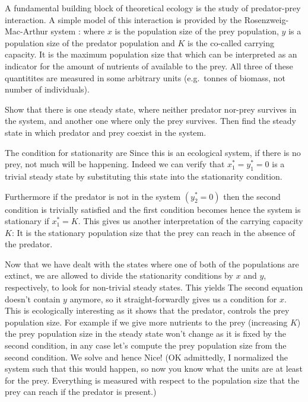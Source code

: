 
A fundamental building block of theoretical ecology is the study of predator-prey interaction. A simple model of this interaction is 
provided by the Rosenzweig-Mac-Arthur system \cite{Rosenzweig}:
where $x$ is the population size of the prey population, $y$ is a population size of the predator population and $K$ is the co-called 
carrying capacity. It is the maximum population size that which can be interpreted as an indicator for the amount of nutrients of available to the prey. All three of these quantitites are measured in some arbitrary units (e.g.~tonnes of biomass, not number of individuals).

\subquestion 
Show that there is one steady state, where neither predator nor-prey survives in the system, and another one where only the prey survives. Then find the steady state in which predator and prey coexist in the system.  

\solution 
The condition for stationarity are 
Since this is an ecological system, if there is no prey, not much will be happening. Indeed we can verify that $x_1^*=y_1^*=0$ is a trivial steady state by substituting this state into the stationarity condition.

Furthermore if the predator is not in the system $(y_2^*=0)$ then the second condition is trivially satisfied and the first condition becomes 
hence the system is stationary if $x_1^*=K$. This gives us another interpretation of the carrying capacity $K$: It is the stationary population size that the prey can reach in the absence of the predator.

Now that we have dealt with the states where one of both of the populations are extinct, we are allowed to divide the stationarity conditions by $x$ and $y$, respectively, to look for non-trivial steady states. This yields
The second equation doesn't contain $y$ anymore, so it straight-forwardly gives us a condition for $x$. This is ecologically interesting as it shows that the predator, controls the prey population size. For example if we give more nutrients to the prey (increasing $K$) the prey population size in the steady state won't change as it is fixed by the second condition, in any case let's compute the prey population size from the second condition. We solve
and hence 
Nice! (OK admittedly, I normalized the system such that this would happen, so now you know what the units are at least for the prey. Everything is measured with respect to the population size that the prey can reach if the predator is present.)

